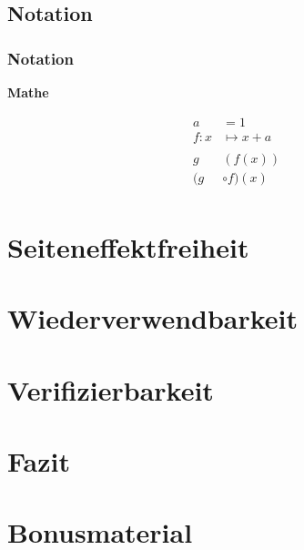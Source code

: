 \documentclass{beamer}
\begin{document}
\subsection{Notation}

\begin{frame}
    \frametitle{Notation}
    \begin{minipage}[t]{0.5\linewidth}
        \begin{center}
            \textbf{Mathe}
        \end{center}
        \begin{align*}
a &= 1 \\
f: x &\mapsto x + a \\
\\
g&(f(x)) \\
(g& \circ f) (x) \\
        \end{align*}
    \end{minipage}%
%

\end{frame}

\section{Seiteneffektfreiheit}
\section{Wiederverwendbarkeit}
\section{Verifizierbarkeit}
\section{Fazit}
\section{Bonusmaterial}
\end{document}
